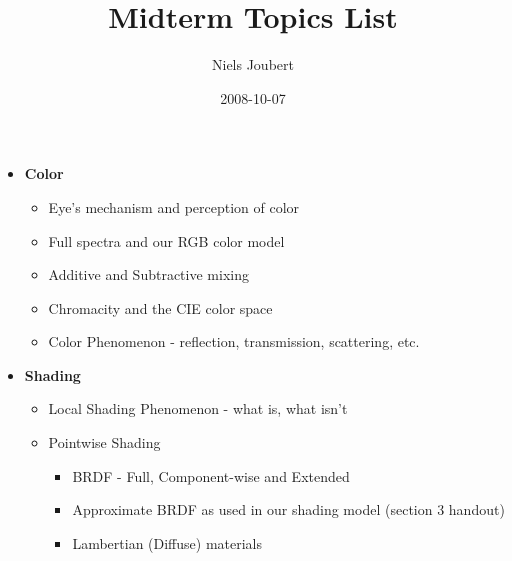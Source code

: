\documentclass[8pt]{article}
\title{Midterm Topics List}
\author{ Niels Joubert }
\date{2008-10-07}
\begin{document}
\ifpdf
{}
\else
{}
\fi

\maketitle

\begin{itemize}
    
    \item \textbf{Color}
    
    \begin{itemize}
        
        \item Eye's mechanism and perception of color
        
        \item Full spectra and our RGB color model
        
        \item Additive and Subtractive mixing
        
        \item Chromacity and the CIE color space
        
        \item Color Phenomenon - reflection, transmission, scattering, etc.
        
    \end{itemize}
    
    \item \textbf{Shading}

    \begin{itemize}
        
        \item Local Shading Phenomenon - what is, what isn't
        
        \item Pointwise Shading
        
        \begin{itemize}
        
            \item BRDF - Full, Component-wise and Extended
        
            \item Approximate BRDF as used in our shading model (section 3 handout)
        
            \item Lambertian (Diffuse) materials
        
        \end{itemize}
        

\end{itemize}
\end{itemize}
\end{document}
